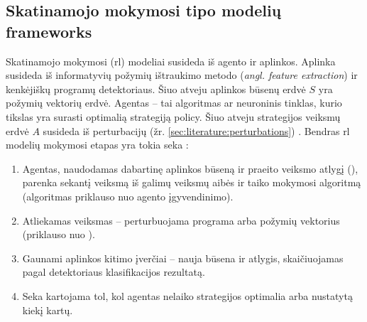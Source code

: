 \subsection{Skatinamojo mokymosi tipo modelių \glspl{framework}}\label{sec:literature:rl}

Skatinamojo mokymosi (\acs{rl}) modeliai susideda iš agento ir aplinkos.
Aplinka susideda iš informatyvių požymių ištraukimo metodo (\textit{angl.
    feature extraction}) ir kenkėjiškų programų detektoriaus. Šiuo atveju aplinkos
būsenų erdvė $S$ yra požymių vektorių erdvė. Agentas -- tai algoritmas ar
neuroninis tinklas, kurio tikslas yra surasti optimalią strategiją
\gls{policy}. Šiuo atveju strategijos veiksmų erdvė $A$ susideda iš
perturbacijų (žr. \ref{sec:literature:perturbations}) \cite{fangEvadingMalwareEngines2019}. Bendras
\ac{rl} modelių mokymosi etapas yra tokia seka \cite{fangEvadingMalwareEngines2019, zhongReinforcementLearningBased2022}:
\begin{enumerate}
    \item Agentas, naudodamas dabartinę aplinkos būseną ir praeito veiksmo atlygį
          (), parenka sekantį veiksmą iš galimų veiksmų aibės ir taiko
          mokymosi algoritmą (algoritmas priklauso nuo agento įgyvendinimo).
    \item Atliekamas veiksmas -- perturbuojama programa arba požymių vektorius (priklauso
          nuo ).
    \item Gaunami aplinkos kitimo įverčiai -- nauja būsena ir atlygis, skaičiuojamas
          pagal detektoriaus klasifikacijos rezultatą.
    \item Seka kartojama tol, kol agentas nelaiko strategijos optimalia arba nustatytą
          kiekį kartų.
\end{enumerate}

